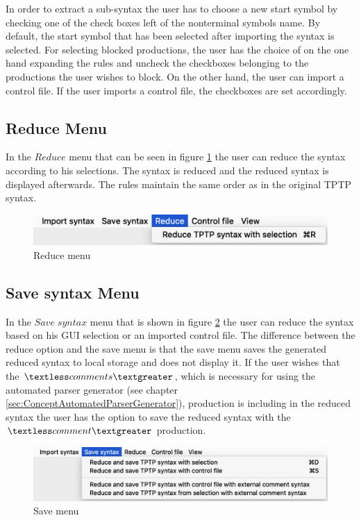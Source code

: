 In order to extract a sub-syntax the user has to choose a new start symbol by checking one of the check boxes left of the nonterminal symbols name. By default, the start symbol that has been selected after importing the syntax is selected. For selecting blocked productions, the user has the choice of on the one hand expanding the rules and uncheck the checkboxes belonging to the productions the user wishes to block. On the other hand, the user can import a control file. If the user imports a control file, the checkboxes are set accordingly.

\subsection{Reduce Menu}\label{sec:ConceptGUIReduceMenu}

In the $Reduce$ menu that can be seen in figure \ref{fig:reduce} the user can reduce the syntax according to his selections. The syntax is reduced and the reduced syntax is displayed afterwards. The rules maintain the same order as in the original \ac{TPTP} syntax.

\begin{figure}[H]
\centering
\includegraphics[width=.7\textwidth]{images/reduce.png}
\caption{Reduce menu}
\label{fig:reduce}
\end{figure}

\subsection{Save syntax Menu}\label{sec:ConceptGUISaveSyntaxMenu}

In the $Save\;syntax$ menu that is shown in figure \ref{fig:save} the user can reduce the syntax based on his GUI selection or an imported control file. The difference between the reduce option and the save menu is that the save menu saves the generated reduced syntax to local storage and does not display it. If the user wishes that the $\textless comments\textgreater$, which is necessary for using the automated parser generator (see chapter \ref{sec:ConceptAutomatedParserGenerator}), production is including in the reduced syntax the user has the option to save the reduced syntax with the $\textless comment\textgreater$ production.

\begin{figure}[H]
\centering
\includegraphics[width=.7\textwidth]{images/save.png}
\caption{Save menu}
\label{fig:save}
\end{figure}

